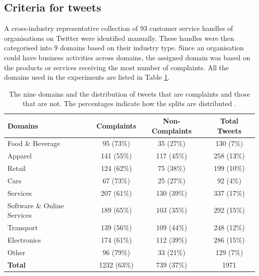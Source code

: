 \subsection{Criteria for tweets}
A cross-industry representative collection of 93 customer service handles of organisations on Twitter were identified manually. These handles were then categorised into 9 domains based on their industry type. Since an organisation could have business activities across domains, the assigned domain was based on the products or services receiving the most number of complaints. All the domains used in the experiments are listed in Table \ref{tab: domains}.
\begin{table}[ht]
    \captionsetup{font=small}
    \small
    \centering
    \begin{tabularx}{\textwidth}{|X|c|c|c|}
        \hline
        \rowcolor[gray]{0.7}
        \textbf{Domains}            & \textbf{Complaints} & \textbf{Non-Complaints} & \textbf{Total Tweets} \\
        \hline
        Food \& Beverage            & 95 \small{(73\%)}   & 35 \small{(27\%)}       & 130 \small{(7\%)}     \\
        \rowcolor[gray]{0.9}
        Apparel                     & 141 \small{(55\%)}  & 117 \small{(45\%)}      & 258 \small{(13\%)}    \\
        Retail                      & 124 \small{(62\%)}  & 75 \small{(38\%)}       & 199 \small{(10\%)}    \\
        \rowcolor[gray]{0.9}
        Cars                        & 67 \small{(73\%)}   & 25 \small{(27\%)}       & 92 \small{(4\%)}      \\
        Services                    & 207 \small{(61\%)}  & 130 \small{(39\%)}      & 337 \small{(17\%)}    \\
        \rowcolor[gray]{0.9}
        Software \& Online Services & 189 \small{(65\%)}  & 103 \small{(35\%)}      & 292 \small{(15\%)}    \\
        Transport                   & 139 \small{(56\%)}  & 109 \small{(44\%)}      & 248 \small{(12\%)}    \\
        \rowcolor[gray]{0.9}
        Electronics                 & 174 \small{(61\%)}  & 112 \small{(39\%)}      & 286 \small{(15\%)}    \\
        Other                       & 96 \small{(79\%)}   & 33 \small{(21\%)}       & 129 \small{(7\%)}     \\
        \hline
        \rowcolor[gray]{0.9}
        \textbf{Total}              & 1232 \small{(63\%)} & 739 \small{(37\%)}      & 1971                  \\
        \hline
    \end{tabularx}
    \caption{The nine domains and the distribution of tweets that are complaints and those that are not. The percentages indicate how the splits are distributed \cite{preotiuc-pietro_automatically_2019}.}
    \label{tab: domains}
\end{table}

